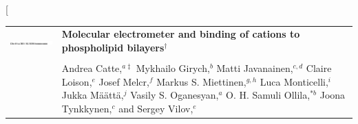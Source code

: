 \documentclass[twoside,twocolumn,9pt]{article}
\begin{document}
\twocolumn[
  \begin{@twocolumnfalse}
\vspace{3cm}
\sffamily
\begin{tabular}{m{4.5cm} p{13.5cm} }

\includegraphics{head_foot/DOI} & \noindent\LARGE{\textbf{Molecular electrometer and binding of cations to phospholipid bilayers$^\dag$}} \\%
\vspace{0.3cm} & \vspace{0.3cm} \\

 & \noindent\large{Andrea Catte,\textit{$^{a\ddag}$} Mykhailo Girych,\textit{$^{b}$} Matti Javanainen,\textit{$^{c,d}$} Claire Loison,\textit{$^{e}$} Josef Melcr,\textit{$^{f}$} Markus S. Miettinen,\textit{$^{g,h}$} Luca Monticelli,\textit{$^{i}$} Jukka M{\"a}{\"a}tt{\"a},\textit{$^{j}$} Vasily S. Oganesyan,\textit{$^{a}$} O. H. Samuli Ollila,\textit{$^{\ast b}$} Joona Tynkkynen,\textit{$^{c}$} and Sergey Vilov,\textit{$^{e}$}
} \\%


\end{tabular}
\end{@twocolumnfalse}
\end{document}
